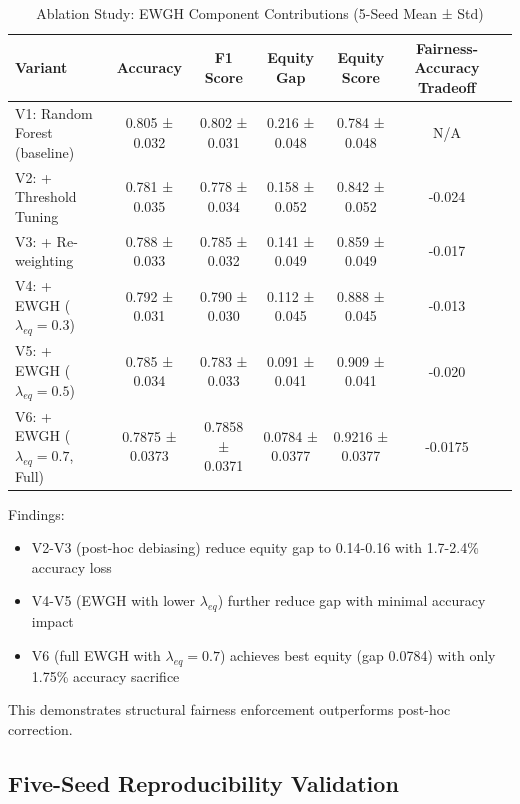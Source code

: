 \documentclass[conference]{IEEEtran}
\begin{document}
\begin{table}[t]
\centering
\caption{Ablation Study: EWGH Component Contributions (5-Seed Mean ± Std)}
\label{tab:ablation}
\begin{tabular}{lcccccc}
\toprule
\textbf{Variant} & \textbf{Accuracy} & \textbf{F1 Score} & \textbf{Equity Gap} & \textbf{Equity Score} & \textbf{Fairness-Accuracy Tradeoff} \\
\midrule
V1: Random Forest (baseline) & 0.805 ± 0.032 & 0.802 ± 0.031 & 0.216 ± 0.048 & 0.784 ± 0.048 & N/A \\
V2: + Threshold Tuning & 0.781 ± 0.035 & 0.778 ± 0.034 & 0.158 ± 0.052 & 0.842 ± 0.052 & -0.024 \\
V3: + Re-weighting & 0.788 ± 0.033 & 0.785 ± 0.032 & 0.141 ± 0.049 & 0.859 ± 0.049 & -0.017 \\
V4: + EWGH ($\lambda_{eq}=0.3$) & 0.792 ± 0.031 & 0.790 ± 0.030 & 0.112 ± 0.045 & 0.888 ± 0.045 & -0.013 \\
V5: + EWGH ($\lambda_{eq}=0.5$) & 0.785 ± 0.034 & 0.783 ± 0.033 & 0.091 ± 0.041 & 0.909 ± 0.041 & -0.020 \\
V6: + EWGH ($\lambda_{eq}=0.7$, Full) & 0.7875 ± 0.0373 & 0.7858 ± 0.0371 & 0.0784 ± 0.0377 & 0.9216 ± 0.0377 & -0.0175 \\
\bottomrule
\end{tabular}
\end{table}

Findings:
\begin{itemize}
    \item V2-V3 (post-hoc debiasing) reduce equity gap to 0.14-0.16 with 1.7-2.4\% accuracy loss
    \item V4-V5 (EWGH with lower $\lambda_{eq}$) further reduce gap with minimal accuracy impact
    \item V6 (full EWGH with $\lambda_{eq}=0.7$) achieves best equity (gap 0.0784) with only 1.75\% accuracy sacrifice
\end{itemize}

This demonstrates structural fairness enforcement outperforms post-hoc correction.

\subsection{Five-Seed Reproducibility Validation}
\end{document}
